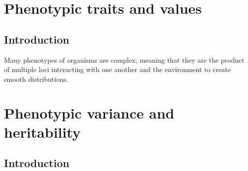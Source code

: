 \documentclass[
]{book}
\begin{document}
\hypertarget{phenotypic-traits-and-values}{%
\chapter{Phenotypic traits and values}\label{phenotypic-traits-and-values}}

\hypertarget{introduction}{%
\section{Introduction}\label{introduction}}

Many phenotypes of organisms are complex, meaning that they are the product of multiple loci interacting with one another and the environment to create smooth distributions.

\hypertarget{phenotypic-variance-and-heritability}{%
\chapter{Phenotypic variance and heritability}\label{phenotypic-variance-and-heritability}}

\hypertarget{introduction-1}{%
\section{Introduction}\label{introduction-1}}

  
\end{document}

